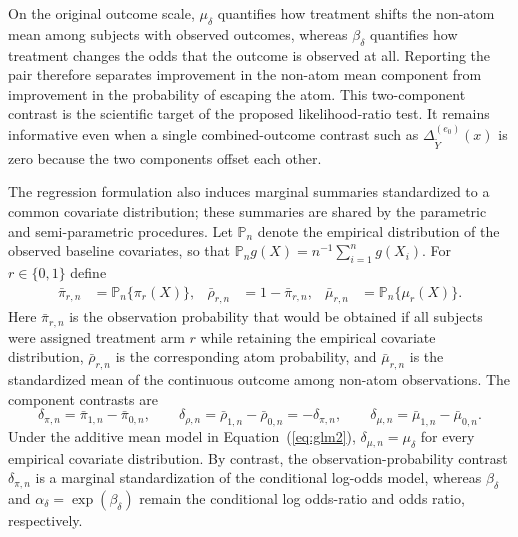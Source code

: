 \documentclass[11pt]{article}
\begin{document}
On the original outcome scale, $\mu_\delta$ quantifies how treatment shifts the non-atom mean among subjects with observed outcomes, whereas $\beta_\delta$ quantifies how treatment changes the odds that the outcome is observed at all. Reporting the pair therefore separates improvement in the non-atom mean component from improvement in the probability of escaping the atom. This two-component contrast is the scientific target of the proposed likelihood-ratio test. It remains informative even when a single combined-outcome contrast such as $\Delta_{\widetilde{Y}}^{(e_0)}(x)$ is zero because the two components offset each other.

The regression formulation also induces marginal summaries standardized to a common covariate distribution; these summaries are shared by the parametric and semi-parametric procedures. Let $\mathbb{P}_n$ denote the empirical distribution of the observed baseline covariates, so that $\mathbb{P}_n g(X) = n^{-1}\sum_{i=1}^n g(X_i)$. For $r \in \{0,1\}$ define
\begin{align}
  \bar{\pi}_{r,n}
  &=
  \mathbb{P}_n\{\pi_r(X)\},
  &
  \bar{\rho}_{r,n}
  &=
  1-\bar{\pi}_{r,n},
  &
  \bar{\mu}_{r,n}
  &=
  \mathbb{P}_n\{\mu_r(X)\}.
  \label{eq:standardized-components}
\end{align}
Here $\bar{\pi}_{r,n}$ is the observation probability that would be obtained if all subjects were assigned treatment arm $r$ while retaining the empirical covariate distribution, $\bar{\rho}_{r,n}$ is the corresponding atom probability, and $\bar{\mu}_{r,n}$ is the standardized mean of the continuous outcome among non-atom observations. The component contrasts are
\[
  \delta_{\pi,n} = \bar{\pi}_{1,n}-\bar{\pi}_{0,n},
  \qquad
  \delta_{\rho,n} = \bar{\rho}_{1,n}-\bar{\rho}_{0,n} = -\delta_{\pi,n},
  \qquad
  \delta_{\mu,n} = \bar{\mu}_{1,n}-\bar{\mu}_{0,n}.
\]
Under the additive mean model in Equation~(\ref{eq:glm2}), $\delta_{\mu,n} = \mu_\delta$ for every empirical covariate distribution. By contrast, the observation-probability contrast $\delta_{\pi,n}$ is a marginal standardization of the conditional log-odds model, whereas $\beta_\delta$ and $\alpha_\delta=\exp(\beta_\delta)$ remain the conditional log odds-ratio and odds ratio, respectively.
\end{document}
